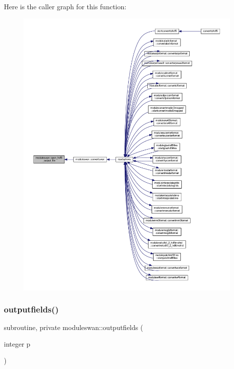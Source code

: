 Here is the caller graph for this function\+:\nopagebreak
\begin{figure}[H]
\begin{center}
\leavevmode
\includegraphics[width=350pt]{namespacemoduleswan_a857ac03cf8baadbf286cb5fb151b21fc_icgraph}
\end{center}
\end{figure}
\mbox{\label{namespacemoduleswan_a2d1606342b5a9024053f2fceb16ae444}} 
\subsubsection{\texorpdfstring{outputfields()}{outputfields()}}
{\footnotesize\ttfamily subroutine, private moduleswan\+::outputfields (\begin{DoxyParamCaption}\item[{integer}]{p }\end{DoxyParamCaption})\hspace{0.3cm}{\ttfamily [private]}}

